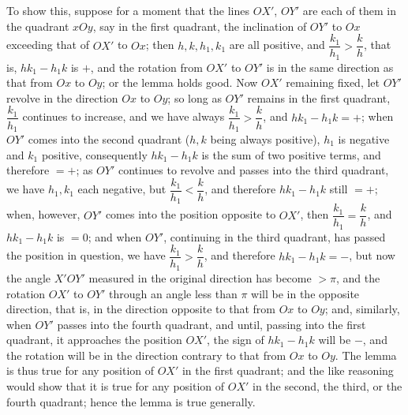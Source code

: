 \documentclass[11pt]{article}
\begin{document}
To show this, suppose for a moment that the lines $OX'$, $OY'$ are each of them in
the quadrant $xOy$, say in the first quadrant, the inclination of $OY'$ to $Ox$
exceeding that of $OX'$ to $Ox$; then $h,k,h_{1},k_{1}$ are all positive, and
$\dfrac{k_{1}}{h_{1}}>\dfrac{k}{h}$, that is, $hk_{1}-h_{1}k$ is $+$, and the rotation from $OX'$ to $OY'$
is in the same direction as that from $Ox$ to $Oy$; or the lemma holds good. Now $OX'$
remaining fixed, let $OY'$ revolve in the direction $Ox$ to $Oy$; so long as $OY'$ remains
in the first quadrant, $\dfrac{k_{1}}{h_{1}}$ continues to increase, and we have always
$\dfrac{k_{1}}{h_{1}}>\dfrac{k}{h}$, and $hk_{1}-h_{1}k=+$; when $OY'$ comes into the second quadrant
($h,k$ being always positive), $h_{1}$ is negative and $k_{1}$ positive, consequently
$hk_{1}-h_{1}k$ is the sum of two positive terms, and therefore $=+$; as $OY'$ continues to
revolve and passes into the third quadrant, we have $h_{1},k_{1}$ each negative, but
$\dfrac{k_{1}}{h_{1}}<\dfrac{k}{h}$, and therefore $hk_{1}-h_{1}k$ still $=+$; when, however, $OY'$ comes into
the position opposite to $OX'$, then $\dfrac{k_{1}}{h_{1}}=\dfrac{k}{h}$, and $hk_{1}-h_{1}k$ is $=0$;
and when $OY'$, continuing in the third quadrant, has passed the position in question,
we have $\dfrac{k_{1}}{h_{1}}>\dfrac{k}{h}$, and therefore $hk_{1}-h_{1}k=-$, but now the angle $X'OY'$
measured in the original direction has become $>\pi$, and the rotation $OX'$ to $OY'$
through an angle less than $\pi$ will be in the opposite direction, that is, in the
direction opposite to that from $Ox$ to $Oy$; and, similarly, when $OY'$ passes into the
fourth quadrant, and until, passing into the first quadrant, it approaches the position
$OX'$, the sign of $hk_{1}-h_{1}k$ will be $-$, and the rotation will be in the direction
contrary to that from $Ox$ to $Oy$. The lemma is thus true for any position of $OX'$
in the first quadrant; and the like reasoning would show that it is true for any
position of $OX'$ in the second, the third, or the fourth quadrant; hence the lemma is
true generally.
\end{document}
